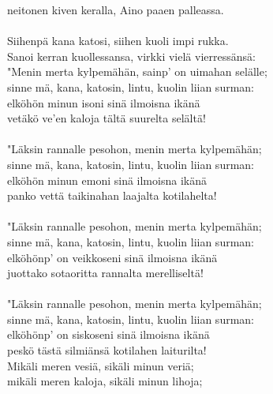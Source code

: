 neitonen kiven keralla, Aino paaen palleassa.                  \\
                                                               \\
Siihenpä kana katosi, siihen kuoli impi rukka.                 \\
Sanoi kerran kuollessansa, virkki vielä vierressänsä:          \\
"Menin merta kylpemähän, sainp' on uimahan selälle;            \\
sinne mä, kana, katosin, lintu, kuolin liian surman:           \\
elköhön minun isoni sinä ilmoisna ikänä                        \\
vetäkö ve'en kaloja tältä suurelta selältä!                    \\
                                                               \\
"Läksin rannalle pesohon, menin merta kylpemähän;              \\
sinne mä, kana, katosin, lintu, kuolin liian surman:           \\
elköhön minun emoni sinä ilmoisna ikänä                        \\
panko vettä taikinahan laajalta kotilahelta!                   \\
                                                               \\
"Läksin rannalle pesohon, menin merta kylpemähän;              \\
sinne mä, kana, katosin, lintu, kuolin liian surman:           \\
elköhönp' on veikkoseni sinä ilmoisna ikänä                    \\
juottako sotaoritta rannalta merelliseltä!                     \\
                                                               \\
"Läksin rannalle pesohon, menin merta kylpemähän;              \\
sinne mä, kana, katosin, lintu, kuolin liian surman:           \\
elköhönp' on siskoseni sinä ilmoisna ikänä                     \\
peskö tästä silmiänsä kotilahen laiturilta!                    \\
Mikäli meren vesiä, sikäli minun veriä;                        \\
mikäli meren kaloja, sikäli minun lihoja;                      \\
